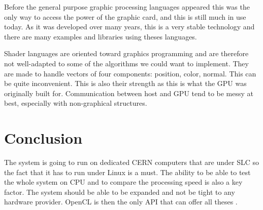 Before the general purpose graphic processing languages appeared this was the only way to access the power of the graphic card, and this is still much in use today. As it was developed over many years, this is a very stable technology and there are many examples and libraries using theses languages.

Shader languages are oriented toward graphics programming and are therefore not well-adapted to some of the algorithms we could want to implement. They are made to handle vectors of four components: position, color, normal. This can be quite inconvenient. This is also their strength as this is what the \gls{GPU} was originally built for. Communication between host and \gls{GPU} tend to be messy at best, especially with non-graphical structures.

\section{Conclusion}

The system is going to run on dedicated \gls{CERN} computers that are under \gls{SLC} so the fact that it has to run under Linux is a must. The ability to be able to test the whole system on CPU and to compare the processing speed is also a key factor. The system should be able to be expanded and not be tight to any hardware provider. \Gls{OpenCL} is then the only \gls{API} that can offer all theses .